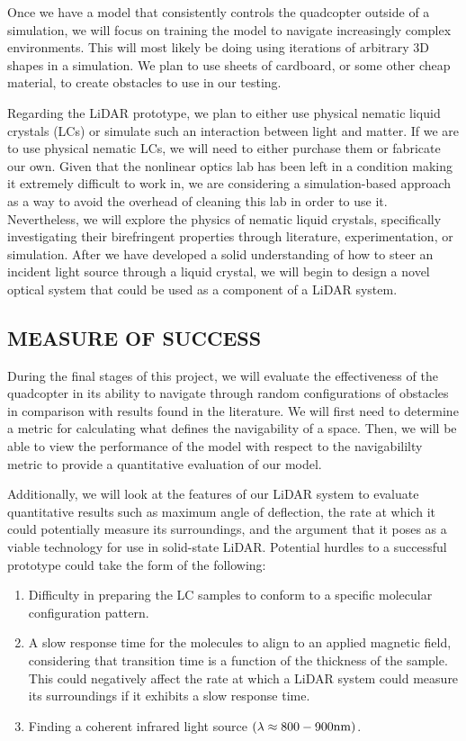 \documentclass[12pt]{article}
\begin{document}
Once we have a model that consistently controls the quadcopter outside of a simulation, we will focus on training the model to navigate increasingly complex environments. This will most likely be doing using iterations of arbitrary 3D shapes in a simulation. We plan to use sheets of cardboard, or some other cheap material, to create obstacles to use in our testing.

Regarding the LiDAR prototype, we plan to either use physical nematic liquid crystals (LCs) or simulate such an interaction between light and matter.
If we are to use physical nematic LCs, we will need to either purchase them or fabricate our own.
Given that the nonlinear optics lab has been left in a condition making it extremely difficult to work in, we are considering a simulation-based approach as a way to avoid the overhead of cleaning this lab in order to use it.
Nevertheless, we will explore the physics of nematic liquid crystals, specifically investigating their birefringent properties through literature, experimentation, or simulation.
After we have developed a solid understanding of how to steer an incident light source through a liquid crystal, we will begin to design a novel optical system that could be used as a component of a LiDAR system.

\subsection*{MEASURE OF SUCCESS}

During the final stages of this project, we will evaluate the effectiveness of the quadcopter in its ability to navigate through random configurations of obstacles in comparison with results found in the literature.
We will first need to determine a metric for calculating what defines the navigability of a space.
Then, we will be able to view the performance of the model with respect to the navigabililty metric to provide a quantitative evaluation of our model.

Additionally, we will look at the features of our LiDAR system to evaluate quantitative results such as maximum angle of deflection, the rate at which it could potentially measure its surroundings, and the argument that it poses as a viable technology for use in solid-state LiDAR.
Potential hurdles to a successful prototype could take the form of the following:

\begin{enumerate}
\item{Difficulty in preparing the LC samples to conform to a specific molecular configuration pattern.}
\item{A slow response time for the molecules to align to an applied magnetic field, considering that transition time is a function of the thickness of the sample. This could negatively affect the rate at which a LiDAR system could measure its surroundings if it exhibits a slow response time. \autocite{cirtoaje2021}}
\item{Finding a coherent infrared light source $(\lambda \approx 800-900\rm{nm})$}.
\end{enumerate}
\end{document}
